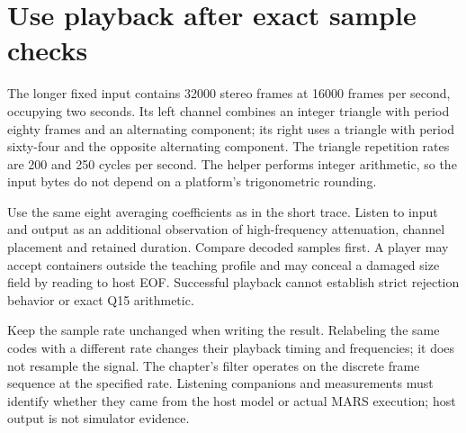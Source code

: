 \section{Use playback after exact sample checks}
The longer fixed input contains 32000 stereo frames at 16000 frames per second,
occupying two seconds. Its left channel combines an integer triangle with period
eighty frames and an alternating component; its right uses a triangle with period
sixty-four and the opposite alternating component. The triangle repetition rates are
200 and 250 cycles per second. The helper performs integer arithmetic, so the input
bytes do not depend on a platform's trigonometric rounding.

Use the same eight averaging coefficients as in the short trace. Listen to input and
output as an additional observation of high-frequency attenuation, channel placement
and retained duration. Compare decoded samples first. A player may accept containers
outside the teaching profile and may conceal a damaged size field by reading to host
EOF. Successful playback cannot establish strict rejection behavior or exact Q15
arithmetic.

Keep the sample rate unchanged when writing the result. Relabeling the same codes with
a different rate changes their playback timing and frequencies; it does not resample
the signal. The chapter's filter operates on the discrete frame sequence at the
specified rate. Listening companions and measurements must identify whether they came
from the host model or actual MARS execution; host output is not simulator evidence.
